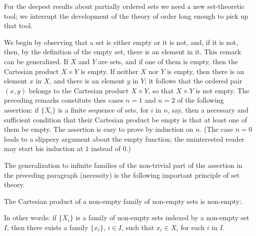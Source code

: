 
For the deepest results about partially ordered sets we need a new set-theoretic tool; we interrupt the development of the theory of order long enough to pick up that tool. 

We begin by observing that a set is either empty or it is not, and, if it is not, then, by the definition of the empty set, there is an element in it. This remark can be generalized. If $X$ and $Y$ are sets, and if one of them is empty, then the Cartesian product $X \times Y$ is empty. If neither $X$ nor $Y$ is empty, then there is an element $x$ in $X$, and there is an element $y$ in $Y$; it follows that the ordered pair $(x, y)$ belongs to the Cartesian product $X \times Y$, so that $X \times Y$ is not empty. The preceding remarks constitute thes cases $n = 1$ and $n = 2$ of the following assertion: if $\{ X_{i} \}$ is a finite sequence of sets, for $i$ in $n$, say, then a necessary and sufficient condition that their Cartesian product be empty is that at least one of them be empty. The assertion is easy to prove by induction on $n$. (The case $n = 0$ leads to a slippery argument about the empty function; the uninterested reader may start his induction at $1$ instead of $0$.) 

The generalization to infinite families of the non-trivial part of the assertion in the preceding paragraph (necessity) is the following important principle of set theory. 

\begin{named} The Cartesian product of a non-empty family of non-empty sets is non-empty:. 
\end{named}

In other words: if $\{ X_{i} \}$ is a family of non-empty sets indexed by a non-empty set $I$, then there exists a family $\{ x_{i} \}$, $i \in I$, such that $x_{i} \in X_{i}$ for each $i$ in $I$. 

